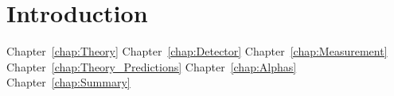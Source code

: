 \chapter{Introduction}
\label{chap:Introduction}

Chapter~\ref{chap:Theory}
Chapter~\ref{chap:Detector}
Chapter~\ref{chap:Measurement}
Chapter~\ref{chap:Theory_Predictions}
Chapter~\ref{chap:Alphas}
Chapter~\ref{chap:Summary}
\begin{comment}
Particle physics is the study to understand the basic elements of matter and the forces governing the interactions among them. The Standard Model is the theory which describes the role of the fundamental particles and their interactions. The stable particles which constitute the matter are the leptons (electron and neutrino), the gauge boson (photon) and the nucleons (proton and neutron). Leptons are the basic fundamental particles and do not posssess any substructure ~\cite{per}.

Experiments at particle accelerators such as LEP (Large Electron collider) collide sub-atomic particles at very high energies and reveal their structures and properties. The accelerators produce interactions which are 
observed by detectors. The end products of such interactions are registered in the sophisticated particle detectors, constituting the real data. Detailed studies related to the nature of the produced particles and their characteristic properties can then be made by analysing these data sets. In the Monte Carlo world, the role of machines is played by the event generators. 


\end{comment}
